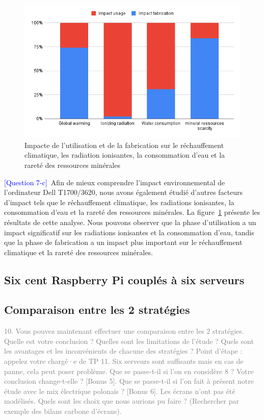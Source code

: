 \documentclass[12pt,a4paper]{paper}
\begin{document}
\begin{figure}[H]%
    \centering
    \includegraphics[width=\linewidth]{img/graph-other.png}
    \caption{Impacte de l'utilisation et de la fabrication sur le réchauffement climatique, les radiation ionisantes, la consommation d'eau et la rareté des ressources minérales}
    \label{fig:other-impact}
\end{figure}
\textcolor{blue}{[Question 7-c]}~Afin de mieux comprendre l'impact environnemental de l'ordinateur Dell T1700/3620, nous avons également étudié d'autres facteurs d'impact tels que le réchauffement climatique, les radiations ionisantes, la consommation d'eau et la rareté des ressources minérales. La figure~\ref{fig:other-impact} présente les résultats de cette analyse. Nous pouvons observer que la phase d'utilisation a un impact significatif sur les radiations ionisantes et la consommation d'eau, tandis que la phase de fabrication a un impact plus important sur le réchauffement climatique et la rareté des ressources minérales.
    
\subsection{Six cent Raspberry Pi couplés à six serveurs}
\textcolor{gray}{\lipsum[1-2] }

\subsection{Comparaison entre les 2 stratégies}

\textcolor{gray}{10. Vous pouvez maintenant effectuer une comparaison entre les 2 stratégies. Quelle est votre}
\textcolor{gray}{conclusion ? Quelles sont les limitations de l’étude ? Quels sont les avantages et les inconvénients}
\textcolor{gray}{de chacune des stratégies ?}
\textcolor{gray}{Point d’étape : appelez votre chargé·e de TP}
\textcolor{gray}{11. Six serveurs sont suffisants mais en cas de panne, cela peut poser problème. Que se passe-t-il}
\textcolor{gray}{si l’on en considère 8 ? Votre conclusion change-t-elle ?}
\textcolor{gray}{[Bonus 5]. Que se passe-t-il si l’on fait à présent notre étude avec le mix électrique polonais ?}
\textcolor{gray}{[Bonus 6]. Les écrans n’ont pas été modélisés. Quels sont les choix que nous aurions pu faire ?}
\textcolor{gray}{(Rechercher par exemple des bilans carbone d’écrans).}
\end{document}
